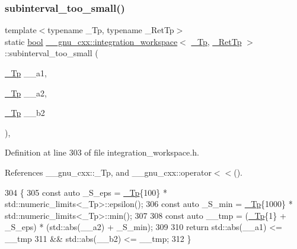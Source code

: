 \subsubsection{\texorpdfstring{subinterval\+\_\+too\+\_\+small()}{subinterval\_too\_small()}}
{\footnotesize\ttfamily template$<$typename \+\_\+\+Tp, typename \+\_\+\+Ret\+Tp$>$ \\
static \hyperlink{namespace____gnu__cxx_ae83aca57f97767d5d09188718728a0ac}{bool} \hyperlink{class____gnu__cxx_1_1integration__workspace}{\+\_\+\+\_\+gnu\+\_\+cxx\+::integration\+\_\+workspace}$<$ \hyperlink{namespace____gnu__cxx_a3b19a9c800ca194374ef9172290f7d79}{\+\_\+\+Tp}, \hyperlink{namespace____gnu__cxx_a886e03ece3d53ff7fa6c098a40f93fa5}{\+\_\+\+Ret\+Tp} $>$\+::subinterval\+\_\+too\+\_\+small (\begin{DoxyParamCaption}\item[{\hyperlink{namespace____gnu__cxx_a3b19a9c800ca194374ef9172290f7d79}{\+\_\+\+Tp}}]{\+\_\+\+\_\+a1,  }\item[{\hyperlink{namespace____gnu__cxx_a3b19a9c800ca194374ef9172290f7d79}{\+\_\+\+Tp}}]{\+\_\+\+\_\+a2,  }\item[{\hyperlink{namespace____gnu__cxx_a3b19a9c800ca194374ef9172290f7d79}{\+\_\+\+Tp}}]{\+\_\+\+\_\+b2 }\end{DoxyParamCaption})\hspace{0.3cm}{\ttfamily [inline]}, {\ttfamily [static]}}



Definition at line 303 of file integration\+\_\+workspace.\+h.



References \+\_\+\+\_\+gnu\+\_\+cxx\+::\+\_\+\+Tp, and \+\_\+\+\_\+gnu\+\_\+cxx\+::operator$<$$<$().


\begin{DoxyCode}
304       \{
305         \textcolor{keyword}{const} \textcolor{keyword}{auto} \_S\_eps = \hyperlink{namespace____gnu__cxx_a3b19a9c800ca194374ef9172290f7d79}{\_Tp}\{100\} * std::numeric\_limits<\_Tp>::epsilon();
306         \textcolor{keyword}{const} \textcolor{keyword}{auto} \_S\_min = \hyperlink{namespace____gnu__cxx_a3b19a9c800ca194374ef9172290f7d79}{\_Tp}\{1000\} * std::numeric\_limits<\_Tp>::min();
307 
308         \textcolor{keyword}{const} \textcolor{keyword}{auto} \_\_tmp = (\hyperlink{namespace____gnu__cxx_a3b19a9c800ca194374ef9172290f7d79}{\_Tp}\{1\} + \_S\_eps) * (std::abs(\_\_a2) + \_S\_min);
309 
310         \textcolor{keywordflow}{return} std::abs(\_\_a1) <= \_\_tmp
311             && std::abs(\_\_b2) <= \_\_tmp;
312       \}
\end{DoxyCode}
\mbox{\label{class____gnu__cxx_1_1integration__workspace_ad04bd21f3292fa2d0093412f97e969b4}} 
